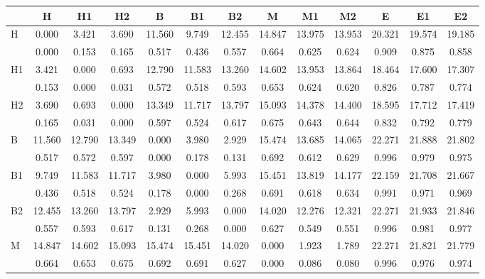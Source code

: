 \begin{table*}[h!]
\begin{center}
\begin{tabular}{| l | c | c | c | c | c | c | c | c | c | c | c | c |}\hline
 & H & H1 & H2 & B & B1 & B2 & M & M1 & M2 & E & E1 & E2 \\\hline
H & 0.000  & 3.421  & 3.690  & 11.560  & 9.749  & 12.455  & 14.847  & 13.975  & 13.953  & 20.321  & 19.574  & 19.185 \\\hline
 & 0.000  & 0.153  & 0.165  & 0.517  & 0.436  & 0.557  & 0.664  & 0.625  & 0.624  & 0.909  & 0.875  & 0.858 \\\hline
H1 & 3.421  & 0.000  & 0.693  & 12.790  & 11.583  & 13.260  & 14.602  & 13.953  & 13.864  & 18.464  & 17.600  & 17.307 \\\hline
 & 0.153  & 0.000  & 0.031  & 0.572  & 0.518  & 0.593  & 0.653  & 0.624  & 0.620  & 0.826  & 0.787  & 0.774 \\\hline
H2 & 3.690  & 0.693  & 0.000  & 13.349  & 11.717  & 13.797  & 15.093  & 14.378  & 14.400  & 18.595  & 17.712  & 17.419 \\\hline
 & 0.165  & 0.031  & 0.000  & 0.597  & 0.524  & 0.617  & 0.675  & 0.643  & 0.644  & 0.832  & 0.792  & 0.779 \\\hline
B & 11.560  & 12.790  & 13.349  & 0.000  & 3.980  & 2.929  & 15.474  & 13.685  & 14.065  & 22.271  & 21.888  & 21.802 \\\hline
 & 0.517  & 0.572  & 0.597  & 0.000  & 0.178  & 0.131  & 0.692  & 0.612  & 0.629  & 0.996  & 0.979  & 0.975 \\\hline
B1 & 9.749  & 11.583  & 11.717  & 3.980  & 0.000  & 5.993  & 15.451  & 13.819  & 14.177  & 22.159  & 21.708  & 21.667 \\\hline
 & 0.436  & 0.518  & 0.524  & 0.178  & 0.000  & 0.268  & 0.691  & 0.618  & 0.634  & 0.991  & 0.971  & 0.969 \\\hline
B2 & 12.455  & 13.260  & 13.797  & 2.929  & 5.993  & 0.000  & 14.020  & 12.276  & 12.321  & 22.271  & 21.933  & 21.846 \\\hline
 & 0.557  & 0.593  & 0.617  & 0.131  & 0.268  & 0.000  & 0.627  & 0.549  & 0.551  & 0.996  & 0.981  & 0.977 \\\hline
M & 14.847  & 14.602  & 15.093  & 15.474  & 15.451  & 14.020  & 0.000  & 1.923  & 1.789  & 22.271  & 21.821  & 21.779 \\\hline
 & 0.664  & 0.653  & 0.675  & 0.692  & 0.691  & 0.627  & 0.000  & 0.086  & 0.080  & 0.996  & 0.976  & 0.974 \\\hline

\end{tabular}
\end{center}
\end{table*}

